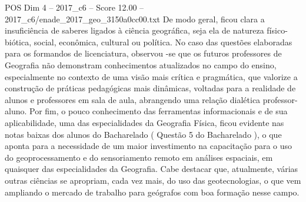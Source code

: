 \begin{textsample}{POS Dim 4 – 2017\_c6 – Score 12.00 – 2017\_c6/enade\_2017\_geo\_3150a0cc00.txt}
De modo geral, ficou clara a insuficiência de saberes ligados à ciência geográfica, seja ela de natureza físico-biótica, social, econômica, cultural ou política.
No caso das questões elaboradas para os formandos de licenciatura, observou -se que os futuros professores de Geografia não demonstram conhecimentos atualizados no campo do ensino, especialmente no contexto de uma visão mais crítica e pragmática, que valorize a construção de práticas pedagógicas mais dinâmicas, voltadas para a realidade de alunos e professores em sala de aula, abrangendo uma relação dialética professor-aluno.
Por fim, o pouco conhecimento das ferramentas informacionais e de sua aplicabilidade, uma das especialidades da Geografia Física, ficou evidente nas notas baixas dos alunos do Bacharelado ( Questão 5 do Bacharelado ), o que aponta para a necessidade de um maior investimento na capacitação para o uso do geoprocessamento e do sensoriamento remoto em análises espaciais, em quaisquer das especialidades da Geografia.
Cabe destacar que, atualmente, várias outras ciências se apropriam, cada vez mais, do uso das geotecnologias, o que vem ampliando o mercado de trabalho para geógrafos com boa formação nesse campo.

\end{textsample}
